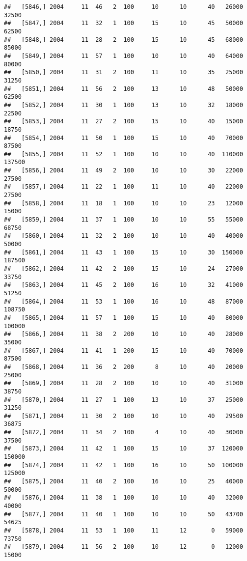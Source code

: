 \documentclass{article}\usepackage[]{graphicx}\usepackage[]{color}
\makeatletter
\newenvironment{kframe}{%
 \def\at@end@of@kframe{}%
 \ifinner\ifhmode%
  \def\at@end@of@kframe{\end{minipage}}%
  \begin{minipage}{\columnwidth}%
 \fi\fi%
 \def\FrameCommand##1{\hskip\@totalleftmargin \hskip-\fboxsep
 \colorbox{shadecolor}{##1}\hskip-\fboxsep
     \hskip-\linewidth \hskip-\@totalleftmargin \hskip\columnwidth}%
 \MakeFramed {\advance\hsize-\width
   \@totalleftmargin\z@ \linewidth\hsize
   \@setminipage}}%
 {\par\unskip\endMakeFramed%
 \at@end@of@kframe}
\newenvironment{knitrout}{}{} %
\makeatother
\begin{document}
\begin{knitrout}
\begin{kframe}
\begin{verbatim}
##   [5846,] 2004     11  46   2  100     10      10      40   26000   32500
##   [5847,] 2004     11  32   1  100     15      10      45   50000   62500
##   [5848,] 2004     11  28   2  100     15      10      45   68000   85000
##   [5849,] 2004     11  57   1  100     10      10      40   64000   80000
##   [5850,] 2004     11  31   2  100     11      10      35   25000   31250
##   [5851,] 2004     11  56   2  100     13      10      48   50000   62500
##   [5852,] 2004     11  30   1  100     13      10      32   18000   22500
##   [5853,] 2004     11  27   2  100     15      10      40   15000   18750
##   [5854,] 2004     11  50   1  100     15      10      40   70000   87500
##   [5855,] 2004     11  52   1  100     10      10      40  110000  137500
##   [5856,] 2004     11  49   2  100     10      10      30   22000   27500
##   [5857,] 2004     11  22   1  100     11      10      40   22000   27500
##   [5858,] 2004     11  18   1  100     10      10      23   12000   15000
##   [5859,] 2004     11  37   1  100     10      10      55   55000   68750
##   [5860,] 2004     11  32   2  100     10      10      40   40000   50000
##   [5861,] 2004     11  43   1  100     15      10      30  150000  187500
##   [5862,] 2004     11  42   2  100     15      10      24   27000   33750
##   [5863,] 2004     11  45   2  100     16      10      32   41000   51250
##   [5864,] 2004     11  53   1  100     16      10      48   87000  108750
##   [5865,] 2004     11  57   1  100     15      10      40   80000  100000
##   [5866,] 2004     11  38   2  200     10      10      40   28000   35000
##   [5867,] 2004     11  41   1  200     15      10      40   70000   87500
##   [5868,] 2004     11  36   2  200      8      10      40   20000   25000
##   [5869,] 2004     11  28   2  100     10      10      40   31000   38750
##   [5870,] 2004     11  27   1  100     13      10      37   25000   31250
##   [5871,] 2004     11  30   2  100     10      10      40   29500   36875
##   [5872,] 2004     11  34   2  100      4      10      40   30000   37500
##   [5873,] 2004     11  42   1  100     15      10      37  120000  150000
##   [5874,] 2004     11  42   1  100     16      10      50  100000  125000
##   [5875,] 2004     11  40   2  100     16      10      25   40000   50000
##   [5876,] 2004     11  38   1  100     10      10      40   32000   40000
##   [5877,] 2004     11  40   1  100     10      10      50   43700   54625
##   [5878,] 2004     11  53   1  100     11      12       0   59000   73750
##   [5879,] 2004     11  56   2  100     10      12       0   12000   15000

\end{verbatim}
\end{kframe}
\end{knitrout}
\end{document}
